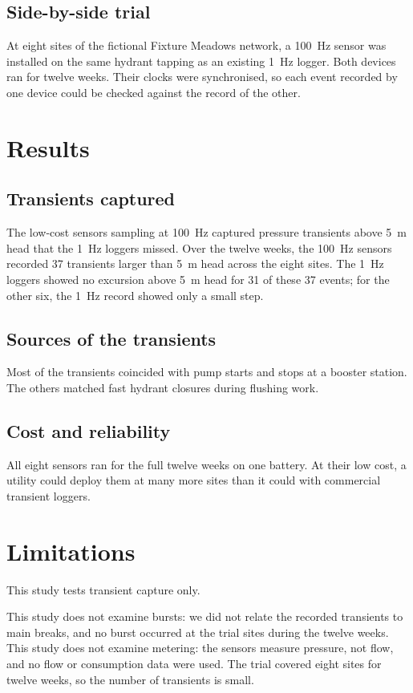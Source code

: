 \documentclass{article}
\begin{document}
\subsection{Side-by-side trial}
\label{sec:method-trial}

At eight sites of the fictional Fixture Meadows network, a 100~Hz sensor was
installed on the same hydrant tapping as an existing 1~Hz logger. Both devices
ran for twelve weeks. Their clocks were synchronised, so each event recorded by
one device could be checked against the record of the other.

\section{Results}
\label{sec:results}

\subsection{Transients captured}
\label{sec:results-captured}

The low-cost sensors sampling at 100~Hz captured pressure transients above 5~m
head that the 1~Hz loggers missed. Over the twelve weeks, the 100~Hz sensors
recorded 37 transients larger than 5~m head across the eight sites. The 1~Hz
loggers showed no excursion above 5~m head for 31 of these 37 events; for the
other six, the 1~Hz record showed only a small step.

\subsection{Sources of the transients}
\label{sec:results-sources}

Most of the transients coincided with pump starts and stops at a booster
station. The others matched fast hydrant closures during flushing work.

\subsection{Cost and reliability}
\label{sec:results-cost}

All eight sensors ran for the full twelve weeks on one battery. At their low
cost, a utility could deploy them at many more sites than it could with
commercial transient loggers.

\section{Limitations}
\label{sec:limitations}

This study tests transient capture only.

This study does not examine bursts: we did not relate the recorded transients
to main breaks, and no burst occurred at the trial sites during the twelve
weeks. This study does not examine metering: the sensors measure pressure, not
flow, and no flow or consumption data were used. The trial covered eight sites
for twelve weeks, so the number of transients is small.
\end{document}

